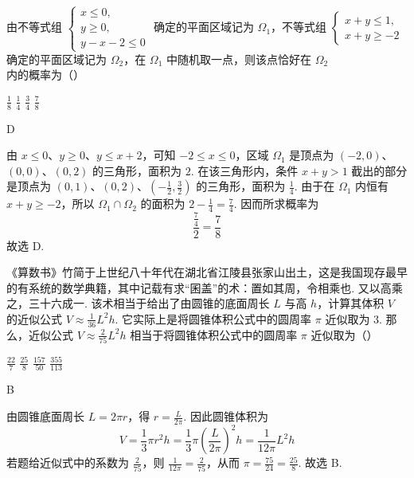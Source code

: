\begin{problem}
由不等式组 \(\begin{cases}
x \leqslant 0,\\
y \geqslant 0,\\
y - x - 2 \leqslant 0
\end{cases}\) 确定的平面区域记为 \(\Omega_1\)，不等式组 \(\begin{cases}
x + y \leqslant 1,\\
x + y \geqslant -2
\end{cases}\) 确定的平面区域记为 \(\Omega_2\)，在 \(\Omega_1\) 中随机取一点，则该点恰好在 \(\Omega_2\) 内的概率为（\quad）

\choices
    {\(\frac{1}{8}\)}
    {\(\frac{1}{4}\)}
    {\(\frac{3}{4}\)}
    {\(\frac{7}{8}\)}
\end{problem}

\begin{answer}
D
\end{answer}

\begin{solution}
由 \(x\leqslant0\)、\(y\geqslant0\)、\(y\leqslant x+2\)，可知 \(-2\leqslant x\leqslant0\)，区域 \(\Omega_1\) 是顶点为 \((-2,0)\)、\((0,0)\)、\((0,2)\) 的三角形，面积为 \(2\). 在该三角形内，条件 \(x+y>1\) 截出的部分是顶点为 \((0,1)\)、\((0,2)\)、\((-\frac12,\frac32)\) 的三角形，面积为 \(\frac14\). 由于在 \(\Omega_1\) 内恒有 \(x+y\geqslant-2\)，所以 \(\Omega_1\cap\Omega_2\) 的面积为 \(2-\frac14=\frac74\). 因而所求概率为
\[
\frac{\frac74}{2}=\frac78
\]
故选 D.
\end{solution}

\begin{problem}
《算数书》竹简于上世纪八十年代在湖北省江陵县张家山出土，这是我国现存最早的有系统的数学典籍，其中记载有求“囷盖”的术：置如其周，令相乘也. 又以高乘之，三十六成一. 该术相当于给出了由圆锥的底面周长 \(L\) 与高 \(h\)，计算其体积 \(V\) 的近似公式 \(V \approx \frac{1}{36} L^2 h\). 它实际上是将圆锥体积公式中的圆周率 \(\pi\) 近似取为 \(3\). 那么，近似公式 \(V \approx \frac{2}{75} L^2 h\) 相当于将圆锥体积公式中的圆周率 \(\pi\) 近似取为（\quad）

\choices
    {\(\frac{22}{7}\)}
    {\(\frac{25}{8}\)}
    {\(\frac{157}{50}\)}
    {\(\frac{355}{113}\)}
\end{problem}

\begin{answer}
B
\end{answer}

\begin{solution}
由圆锥底面周长 \(L=2\pi r\)，得 \(r=\frac{L}{2\pi}\). 因此圆锥体积为
\[
V=\frac13\pi r^2h=\frac13\pi\left(\frac{L}{2\pi}\right)^2h=\frac{1}{12\pi}L^2h
\]
若题给近似式中的系数为 \(\frac{2}{75}\)，则 \(\frac{1}{12\pi}=\frac{2}{75}\)，从而 \(\pi=\frac{75}{24}=\frac{25}{8}\). 故选 B.
\end{solution}

